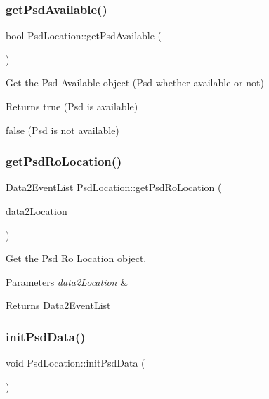 \subsubsection{\texorpdfstring{get\+Psd\+Available()}{getPsdAvailable()}}
{\footnotesize\ttfamily bool Psd\+Location\+::get\+Psd\+Available (\begin{DoxyParamCaption}{ }\end{DoxyParamCaption})}



Get the Psd Available object (Psd whether available or not) 

\begin{DoxyReturn}{Returns}
true (Psd is available) 

false (Psd is not available) 
\end{DoxyReturn}
\mbox{\label{class_psd_location_a5bb3ffaeee69beeece9175c0b8bdf491}} 
\subsubsection{\texorpdfstring{get\+Psd\+Ro\+Location()}{getPsdRoLocation()}}
{\footnotesize\ttfamily \hyperlink{_psd_location_8h_a61af0449f917913c902b37ed397eb350}{Data2\+Event\+List} Psd\+Location\+::get\+Psd\+Ro\+Location (\begin{DoxyParamCaption}\item[{\hyperlink{_psd_location_8h_a1e3a92020005d2a81aa50ba5ae9b129c}{Data2\+Location}}]{data2\+Location }\end{DoxyParamCaption})}



Get the Psd Ro Location object. 


\begin{DoxyParams}{Parameters}
{\em data2\+Location} & \\
\hline
\end{DoxyParams}
\begin{DoxyReturn}{Returns}
Data2\+Event\+List 
\end{DoxyReturn}
\mbox{\label{class_psd_location_a4ea349a64cd856f29a26d93f520fc38f}} 
\subsubsection{\texorpdfstring{init\+Psd\+Data()}{initPsdData()}}
{\footnotesize\ttfamily void Psd\+Location\+::init\+Psd\+Data (\begin{DoxyParamCaption}{ }\end{DoxyParamCaption})}



